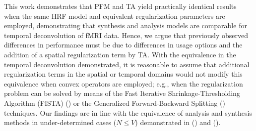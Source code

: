 
This work demonstrates that PFM and TA yield practically identical results when the same HRF model and equivalent regularization parameters are employed, demonstrating that synthesis and analysis models are comparable for temporal deconvolution of fMRI data. Hence, we argue that previously observed differences in performance must be due to differences in usage options and the addition of a spatial regularization term by TA. With the equivalence in the temporal deconvolution demonstrated, it is reasonable to assume that additional regularization terms in the spatial or temporal domains would not modify this equivalence when convex operators are employed; e.g., when the regularization problem can be solved by means of the Fast Iterative Shrinkage-Thresholding Algorithm (FISTA) (\citealt{Beck2009FastIterativeShrinkage}) or the Generalized Forward-Backward Splitting (\citealt{Raguet2013GeneralizedForwardBackward}) techniques. Our findings are in line with the equivalence of analysis and synthesis methods in under-determined cases (\(N \leq V\)) demonstrated in (\citealt{Elad2007Analysisversussynthesis}) and (\citealt{Ortelli2020Oracleinequalitiessquare}).

